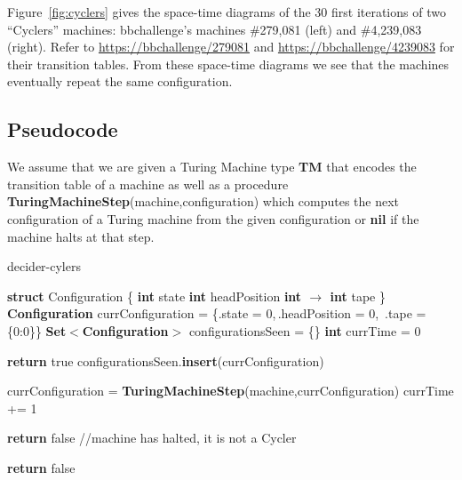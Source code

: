 \begin{example}\normalfont
Figure~\ref{fig:cyclers} gives the space-time diagrams of the 30 first iterations of two ``Cyclers'' machines: bbchallenge's machines \#279,081 (left) and \#4,239,083 (right). Refer to \url{https://bbchallenge/279081} and 
\url{https://bbchallenge/4239083} for their transition tables. From these space-time diagrams we see that the machines eventually repeat the same configuration.
\end{example}

\newpage
\subsection{Pseudocode}

We assume that we are given a Turing Machine type \textbf{TM} that encodes the transition table of a machine as well as a procedure \textbf{TuringMachineStep}(machine,configuration) which computes the next configuration of a Turing machine from the given configuration or \textbf{nil} if the machine halts at that step.

\begin{algorithm}
        \caption{{\sc decider-cylers}}\label{alg:cyclers}

        \begin{algorithmic}[1]

                \State \textbf{struct} Configuration \{
                \State \tabi\textbf{int} state
                \State \tabi\textbf{int} headPosition
                \State \tabi\textbf{int $\boldsymbol{\to}$ int} tape
                \State \}
                \State \textbf{Configuration} currConfiguration = \{.state = 0,$\,$.headPosition = 0,$\,$ .tape = \{0:0\}\}
                \State \textbf{Set$\boldsymbol{<}$Configuration$\boldsymbol{>}$} configurationsSeen = \{\}
                \State \textbf{int} currTime = 0

                \State \textbf{return} true
                \EndIf
                \State configurationsSeen.\textbf{insert}(currConfiguration)

                \State currConfiguration = \textbf{TuringMachineStep}(machine,currConfiguration)
                \State currTime += 1


                \State \textbf{return} false //machine has halted, it is not a Cycler
                \EndIf
                \EndWhile

                \State \textbf{return} false
                \EndProcedure

        \end{algorithmic}
\end{algorithm}

